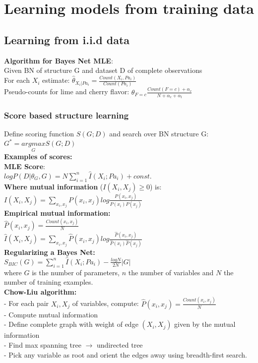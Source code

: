 \section{Learning models from training data}
\subsection{Learning from i.i.d data}
\textbf{Algorithm for Bayes Net MLE}:\\
Given BN of structure G and dataset D of complete observations\\
For each $X_i$ estimate:
$\hat{\theta}_{X_i|Pa_i}=\frac{Count(X_i, Pa_i)}{Count(Pa_i)}$\\
Pseudo-counts for lime and cherry flavor: $\theta_{F=c}\frac{Count(F=c)+\alpha_c}{N+\alpha_c + \alpha_l}$

\subsubsection{Score based structure learning}
Define scoring function $S(G;D)$ and search over BN structure G: $G^*=\underset{G}{argmax}S(G;D)$\\
\textbf{Examples of scores:\\
MLE Score}:\\
$log P(D|\theta_G, G) = N \sum_{i=1}^n \hat{I}(X_i;Pa_i) + const.$\\
\textbf{Where mutual information} ($I(X_i, X_j)\geq 0$) is:\\
$I(X_i, X_j)=\sum_{x_i, x_j}P(x_i, x_j)log\frac{P(x_i, x_j)}{P(x_i)P(x_j)}$ \\
\textbf{Empirical mutual information:}\\
$\hat{P}(x_i,x_j)=\frac{Count(x_i, x_j)}{N}$\\
$\hat{I}(X_i, X_j)= \sum_{x_i, x_j}\hat{P}(x_i, x_j)log\frac{\hat{P}(x_i, x_j)}{\hat{P}(x_i)\hat{P}(x_j)}$\\
\textbf{Regularizing a Bayes Net:}\\
$S_{BIC}(G) = \sum_{i=1}^n \hat{I}(X_i;Pa_i) - \frac{log N}{2N}|G|$ \\
where $G$ is the number of parameters, $n$ the number of variables and $N$ the number of training examples.\\
\textbf{Chow-Liu algorithm:}\\
- For each pair $X_i, X_j$ of variables, compute: $\hat{P}(x_i,x_j)=\frac{Count(x_i, x_j)}{N}$\\
- Compute mutual information\\
- Define complete graph with weight of edge $(X_i, X_j)$ given by the mutual information\\
- Find max spanning tree $\rightarrow$ undirected tree\\
- Pick any variable as root and orient the edges away using breadth-first search.\\

